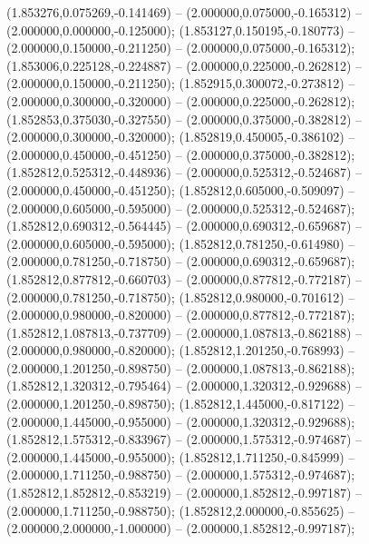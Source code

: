  (1.853276,0.075269,-0.141469) -- (2.000000,0.075000,-0.165312) -- (2.000000,0.000000,-0.125000);
 (1.853127,0.150195,-0.180773) -- (2.000000,0.150000,-0.211250) -- (2.000000,0.075000,-0.165312);
 (1.853006,0.225128,-0.224887) -- (2.000000,0.225000,-0.262812) -- (2.000000,0.150000,-0.211250);
 (1.852915,0.300072,-0.273812) -- (2.000000,0.300000,-0.320000) -- (2.000000,0.225000,-0.262812);
 (1.852853,0.375030,-0.327550) -- (2.000000,0.375000,-0.382812) -- (2.000000,0.300000,-0.320000);
 (1.852819,0.450005,-0.386102) -- (2.000000,0.450000,-0.451250) -- (2.000000,0.375000,-0.382812);
 (1.852812,0.525312,-0.448936) -- (2.000000,0.525312,-0.524687) -- (2.000000,0.450000,-0.451250);
 (1.852812,0.605000,-0.509097) -- (2.000000,0.605000,-0.595000) -- (2.000000,0.525312,-0.524687);
 (1.852812,0.690312,-0.564445) -- (2.000000,0.690312,-0.659687) -- (2.000000,0.605000,-0.595000);
 (1.852812,0.781250,-0.614980) -- (2.000000,0.781250,-0.718750) -- (2.000000,0.690312,-0.659687);
 (1.852812,0.877812,-0.660703) -- (2.000000,0.877812,-0.772187) -- (2.000000,0.781250,-0.718750);
 (1.852812,0.980000,-0.701612) -- (2.000000,0.980000,-0.820000) -- (2.000000,0.877812,-0.772187);
 (1.852812,1.087813,-0.737709) -- (2.000000,1.087813,-0.862188) -- (2.000000,0.980000,-0.820000);
 (1.852812,1.201250,-0.768993) -- (2.000000,1.201250,-0.898750) -- (2.000000,1.087813,-0.862188);
 (1.852812,1.320312,-0.795464) -- (2.000000,1.320312,-0.929688) -- (2.000000,1.201250,-0.898750);
 (1.852812,1.445000,-0.817122) -- (2.000000,1.445000,-0.955000) -- (2.000000,1.320312,-0.929688);
 (1.852812,1.575312,-0.833967) -- (2.000000,1.575312,-0.974687) -- (2.000000,1.445000,-0.955000);
 (1.852812,1.711250,-0.845999) -- (2.000000,1.711250,-0.988750) -- (2.000000,1.575312,-0.974687);
 (1.852812,1.852812,-0.853219) -- (2.000000,1.852812,-0.997187) -- (2.000000,1.711250,-0.988750);
 (1.852812,2.000000,-0.855625) -- (2.000000,2.000000,-1.000000) -- (2.000000,1.852812,-0.997187);

